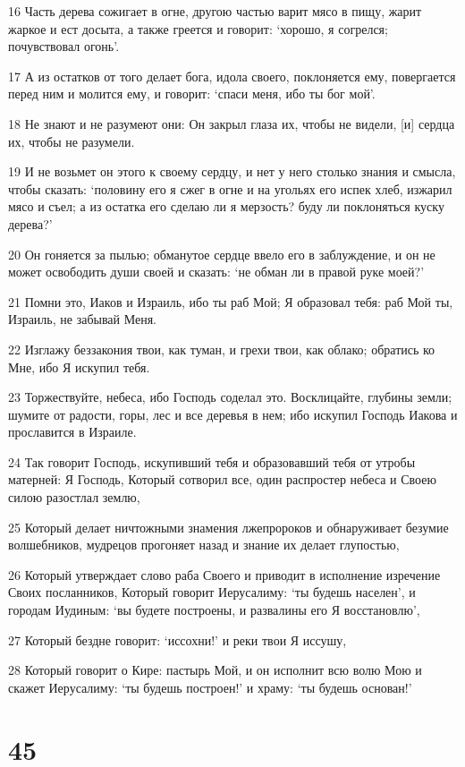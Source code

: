 \par 16 Часть дерева сожигает в огне, другою частью варит мясо в пищу, жарит жаркое и ест досыта, а также греется и говорит: `хорошо, я согрелся; почувствовал огонь'.
\par 17 А из остатков от того делает бога, идола своего, поклоняется ему, повергается перед ним и молится ему, и говорит: `спаси меня, ибо ты бог мой'.
\par 18 Не знают и не разумеют они: Он закрыл глаза их, чтобы не видели, [и] сердца их, чтобы не разумели.
\par 19 И не возьмет он этого к своему сердцу, и нет у него столько знания и смысла, чтобы сказать: `половину его я сжег в огне и на угольях его испек хлеб, изжарил мясо и съел; а из остатка его сделаю ли я мерзость? буду ли поклоняться куску дерева?'
\par 20 Он гоняется за пылью; обманутое сердце ввело его в заблуждение, и он не может освободить души своей и сказать: `не обман ли в правой руке моей?'
\par 21 Помни это, Иаков и Израиль, ибо ты раб Мой; Я образовал тебя: раб Мой ты, Израиль, не забывай Меня.
\par 22 Изглажу беззакония твои, как туман, и грехи твои, как облако; обратись ко Мне, ибо Я искупил тебя.
\par 23 Торжествуйте, небеса, ибо Господь соделал это. Восклицайте, глубины земли; шумите от радости, горы, лес и все деревья в нем; ибо искупил Господь Иакова и прославится в Израиле.
\par 24 Так говорит Господь, искупивший тебя и образовавший тебя от утробы матерней: Я Господь, Который сотворил все, один распростер небеса и Своею силою разостлал землю,
\par 25 Который делает ничтожными знамения лжепророков и обнаруживает безумие волшебников, мудрецов прогоняет назад и знание их делает глупостью,
\par 26 Который утверждает слово раба Своего и приводит в исполнение изречение Своих посланников, Который говорит Иерусалиму: `ты будешь населен', и городам Иудиным: `вы будете построены, и развалины его Я восстановлю',
\par 27 Который бездне говорит: `иссохни!' и реки твои Я иссушу,
\par 28 Который говорит о Кире: пастырь Мой, и он исполнит всю волю Мою и скажет Иерусалиму: `ты будешь построен!' и храму: `ты будешь основан!'

\chapter{45}

